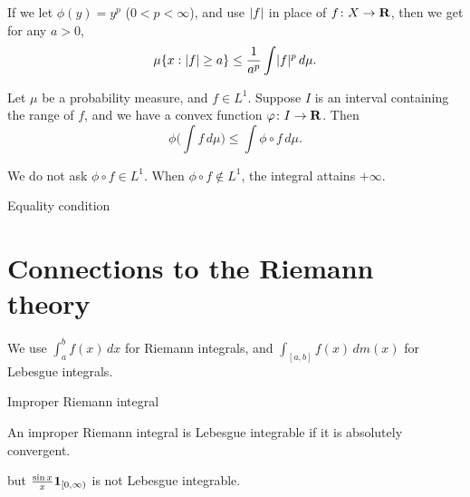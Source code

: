 If we let $\phi(y) = y^p$ ($0<p<\infty$), and use $\lvert f \rvert$ in place of $f\colon X\to \mathbf{R}$, then we get for any $a > 0$, \begin{equation}
    \mu\{x:\abs{f}\geq a\} \leq \frac{1}{a^p}\int \abs{f}^p\,d\mu. \label{eq:Lp-Markov}
\end{equation}

\begin{namedthm} \label{thm:Jensen-ms}
    Let $\mu$ be a probability measure, and $f\in L^1$. Suppose $I$ is an interval containing the range of $f$, and we have a convex function $\varphi\colon I\to \mathbf{R}$. %
    Then \begin{equation}
        \phi\biggl(\int f\,d\mu\biggr) \leq \int \phi\circ f \,d\mu. \label{eq:jensen}
    \end{equation}

    We do not ask $\phi \circ f\in L^1$. When $\phi \circ f \notin L^1$, the integral attains $+\infty$.
\end{namedthm}

Equality condition


\section{Connections to the Riemann theory}

\begin{namedthm}
    
\end{namedthm}

We use $\int_a^b f(x)\,dx$ for Riemann integrals, and $\int_{[a,b]} f(x)\,dm(x)$ for Lebesgue integrals.

Improper Riemann integral 

An improper Riemann integral is Lebesgue integrable if it is absolutely convergent.

 but $\frac{\sin x}{x} \mathbf{1}_{[0,\infty)}$ is not Lebesgue integrable.

